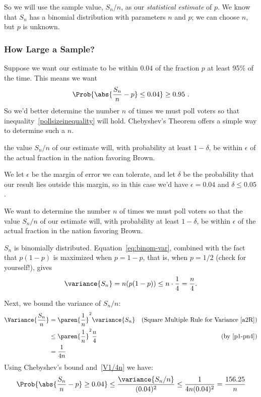 \iffalse Note that
\[
\expect{\frac{S_n}{n}} = \sum_{i=1}^n \expect{K_i} = pn.
\]
\fi

So we will use the sample value, $S_n/n$, as our \emph{statistical
  estimate} of $p$.  We know that $S_n$ has a binomial distribution
with parameters $n$ and $p$; we can choose $n$, but $p$ is unknown.

\subsubsection{How Large a Sample?}
Suppose we want our estimate to be within $0.04$ of the fraction $p$
at least 95\% of the time.  This means we want
\begin{equation}\label{pollsizeinequality}
\Prob{\abs{\frac{S_n}{n} - p} \leq 0.04} \geq 0.95\ .
\end{equation}
So we'd better determine the number $n$ of times we must poll voters so
that inequality~\eqref{pollsizeinequality} will hold.  Chebyshev's
Theorem offers a simple way to determine such a $n$.

\begin{editingnotes}
the value $S_n/n$ of our estimate will, with probability at least
$1 -\delta$, be within $\epsilon$ of the actual fraction in the nation
favoring Brown.

We let $\epsilon$ be the margin of error we can tolerate, and let $\delta$
be the probability that our result lies outside this margin, so in this
case we'd have $\epsilon = 0.04$ and $\delta \le 0.05$.

We want to determine the number $n$ of times we must poll voters so that
the value $S_n/n$ of our estimate will, with probability at least
$1 -\delta$, be within $\epsilon$ of the actual fraction in the nation
favoring Brown.
\end{editingnotes}

$S_n$ is binomially distributed.  Equation~\eqref{eq:binom-var},
combined with the fact that $p(1-p)$ is maximized when $p = 1-p$, that
is, when $p=1/2$ (check for yourself!), gives
\begin{equation}\label{p1-pn4}
\variance{S_n}  = n(p(1-p)) \leq n \cdot \frac{1}{4} = \frac{n}{4}.
\end{equation}

Next, we bound the variance of $S_n/n$:
\begin{align}
\Variance{\frac{S_n}{n}}
       & = \paren{\frac{1}{n}}^2 \variance{S_n}
                     & \text{(Square Multiple Rule for Variance~\eqref{a2R})}\notag\\
       & \leq \paren{\frac{1}{n}}^2 \frac{n}{4} & \text{(by~\eqref{p1-pn4})}\notag\\
       & = \frac{1}{4n}\label{V1/4n}
\end{align}
Using Chebyshev's bound and~\eqref{V1/4n} we have:
\begin{equation}\label{CK}
\Prob{\abs{\frac{S_n}{n} - p} \geq 0.04}
    \leq \frac{\variance{S_n/n}}{(0.04)^2}
       \leq \frac{1}{4n(0.04)^2} = \frac{156.25}{n}
\end{equation}


